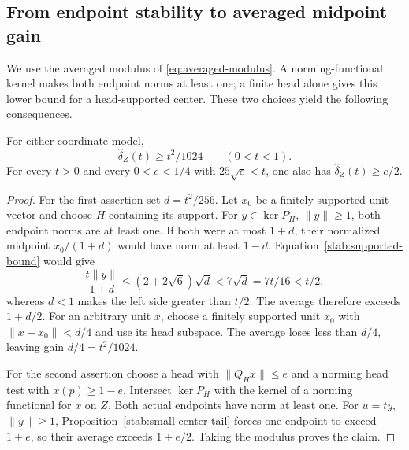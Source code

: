 \subsection{From endpoint stability to averaged midpoint gain}

We use the averaged modulus of \eqref{eq:averaged-modulus}.
A norming-functional kernel makes both endpoint norms at least one;
a finite head alone gives this lower bound for a head-supported
center.  These two choices yield the following consequences.

\begin{corollary}\label{stab:averaged-gain}
For either coordinate model,
\[
 \widehat\delta_Z(t)\ge t^2/1024\qquad(0<t<1).
\]
For every $t>0$ and every $0<e<1/4$ with $25\sqrt e<t$, one also
has $\widehat\delta_Z(t)\ge e/2$.
\end{corollary}

\begin{proof}
For the first assertion set $d=t^2/256$.  Let $x_0$ be a finitely
supported unit vector and choose $H$ containing its support.
For $y\in\ker P_H$, $\|y\|\ge1$, both endpoint norms are at
least one.  If both were at most $1+d$, their normalized midpoint
$x_0/(1+d)$ would have norm at least $1-d$.
Equation~\eqref{stab:supported-bound} would give
\[
 \frac{t\|y\|}{1+d}\le(2+2\sqrt6)\sqrt d
 <7\sqrt d=7t/16<t/2,
\]
whereas $d<1$ makes the left side greater than $t/2$.
The average therefore exceeds $1+d/2$.  For an arbitrary unit
$x$, choose a finitely supported unit $x_0$ with
$\|x-x_0\|<d/4$ and use its head subspace.  The average loses
less than $d/4$, leaving gain $d/4=t^2/1024$.

For the second assertion choose a head with $\|Q_Hx\|\le e$ and
a norming head test with $x(p)\ge1-e$.  Intersect $\ker P_H$
with the kernel of a norming functional for $x$ on $Z$.
Both actual endpoints have norm at least one.  For $u=ty$,
$\|y\|\ge1$, Proposition~\ref{stab:small-center-tail} forces
one endpoint to exceed $1+e$, so their average exceeds $1+e/2$.
Taking the modulus proves the claim.
\end{proof}
